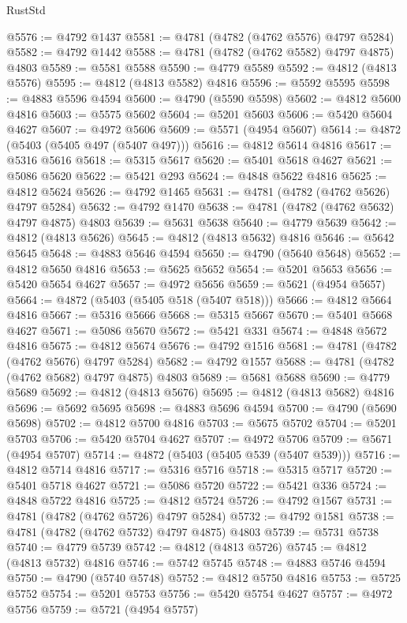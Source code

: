 \begin{lexlean}{RustStd}
\begin{coremodule}
@5576 := @4792 @1437
@5581 := @4781 (@4782 (@4762 @5576) @4797 @5284)
@5582 := @4792 @1442
@5588 := @4781 (@4782 (@4762 @5582) @4797 @4875) @4803
@5589 := @5581 @5588
@5590 := @4779 @5589
@5592 := @4812 (@4813 @5576)
@5595 := @4812 (@4813 @5582) @4816
@5596 := @5592 @5595
@5598 := @4883 @5596 @4594
@5600 := @4790 (@5590 @5598)
@5602 := @4812 @5600 @4816
@5603 := @5575 @5602
@5604 := @5201 @5603
@5606 := @5420 @5604 @4627
@5607 := @4972 @5606
@5609 := @5571 (@4954 @5607)
@5614 := @4872 (@5403 (@5405 @497 (@5407 @497)))
@5616 := @4812 @5614 @4816
@5617 := @5316 @5616
@5618 := @5315 @5617
@5620 := @5401 @5618 @4627
@5621 := @5086 @5620
@5622 := @5421 @293
@5624 := @4848 @5622 @4816
@5625 := @4812 @5624
@5626 := @4792 @1465
@5631 := @4781 (@4782 (@4762 @5626) @4797 @5284)
@5632 := @4792 @1470
@5638 := @4781 (@4782 (@4762 @5632) @4797 @4875) @4803
@5639 := @5631 @5638
@5640 := @4779 @5639
@5642 := @4812 (@4813 @5626)
@5645 := @4812 (@4813 @5632) @4816
@5646 := @5642 @5645
@5648 := @4883 @5646 @4594
@5650 := @4790 (@5640 @5648)
@5652 := @4812 @5650 @4816
@5653 := @5625 @5652
@5654 := @5201 @5653
@5656 := @5420 @5654 @4627
@5657 := @4972 @5656
@5659 := @5621 (@4954 @5657)
@5664 := @4872 (@5403 (@5405 @518 (@5407 @518)))
@5666 := @4812 @5664 @4816
@5667 := @5316 @5666
@5668 := @5315 @5667
@5670 := @5401 @5668 @4627
@5671 := @5086 @5670
@5672 := @5421 @331
@5674 := @4848 @5672 @4816
@5675 := @4812 @5674
@5676 := @4792 @1516
@5681 := @4781 (@4782 (@4762 @5676) @4797 @5284)
@5682 := @4792 @1557
@5688 := @4781 (@4782 (@4762 @5682) @4797 @4875) @4803
@5689 := @5681 @5688
@5690 := @4779 @5689
@5692 := @4812 (@4813 @5676)
@5695 := @4812 (@4813 @5682) @4816
@5696 := @5692 @5695
@5698 := @4883 @5696 @4594
@5700 := @4790 (@5690 @5698)
@5702 := @4812 @5700 @4816
@5703 := @5675 @5702
@5704 := @5201 @5703
@5706 := @5420 @5704 @4627
@5707 := @4972 @5706
@5709 := @5671 (@4954 @5707)
@5714 := @4872 (@5403 (@5405 @539 (@5407 @539)))
@5716 := @4812 @5714 @4816
@5717 := @5316 @5716
@5718 := @5315 @5717
@5720 := @5401 @5718 @4627
@5721 := @5086 @5720
@5722 := @5421 @336
@5724 := @4848 @5722 @4816
@5725 := @4812 @5724
@5726 := @4792 @1567
@5731 := @4781 (@4782 (@4762 @5726) @4797 @5284)
@5732 := @4792 @1581
@5738 := @4781 (@4782 (@4762 @5732) @4797 @4875) @4803
@5739 := @5731 @5738
@5740 := @4779 @5739
@5742 := @4812 (@4813 @5726)
@5745 := @4812 (@4813 @5732) @4816
@5746 := @5742 @5745
@5748 := @4883 @5746 @4594
@5750 := @4790 (@5740 @5748)
@5752 := @4812 @5750 @4816
@5753 := @5725 @5752
@5754 := @5201 @5753
@5756 := @5420 @5754 @4627
@5757 := @4972 @5756
@5759 := @5721 (@4954 @5757)

\end{coremodule}
\end{lexlean}
